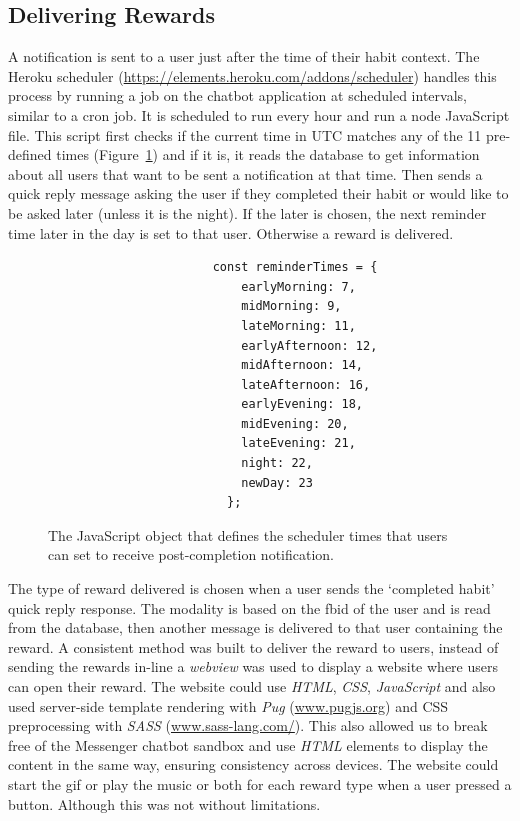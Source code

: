 \subsection{Delivering Rewards}
A notification is sent to a user just after the time of their habit context. The Heroku scheduler (\url{https://elements.heroku.com/addons/scheduler}) handles this process by running a job on the chatbot application at scheduled intervals, similar to a cron job. It is scheduled to run every hour and run a node JavaScript file. This script first checks if the current time in UTC matches any of the 11 pre-defined times (Figure~\ref{fig:reminder_times}) and if it is, it reads the database to get information about all users that want to be sent a notification at that time. Then sends a quick reply message asking the user if they completed their habit or would like to be asked later (unless it is the night). If the later is chosen, the next reminder time later in the day is set to that user. Otherwise a reward is delivered.


\begin{figure}[H]
  \centering
\begin{lstlisting}
                       const reminderTimes = {
                           earlyMorning: 7,
                           midMorning: 9,
                           lateMorning: 11,
                           earlyAfternoon: 12,
                           midAfternoon: 14,
                           lateAfternoon: 16,
                           earlyEvening: 18,
                           midEvening: 20,
                           lateEvening: 21,
                           night: 22,
                           newDay: 23
                         };
\end{lstlisting}

  \caption{The JavaScript object that defines the scheduler times that users can set to receive post-completion notification.}
  \label{fig:reminder_times}
\end{figure}

The type of reward delivered is chosen when a user sends the `completed habit' quick reply response. The modality is based on the fbid of the user and is read from the database, then another message is delivered to that user containing the reward. A consistent method was built to deliver the reward to users, instead of sending the rewards in-line a \textit{webview} was used to display a website where users can open their reward. The website could use \textit{HTML}, \textit{CSS}, \textit{JavaScript} and also used server-side template rendering with \textit{Pug} (\url{www.pugjs.org}) and CSS preprocessing with \textit{SASS} (\url{www.sass-lang.com/}). This also allowed us to break free of the Messenger chatbot sandbox and use \textit{HTML} elements to display the content in the same way, ensuring consistency across devices. The website could start the gif or play the music or both for each reward type when a user pressed a button. Although this was not without limitations.

